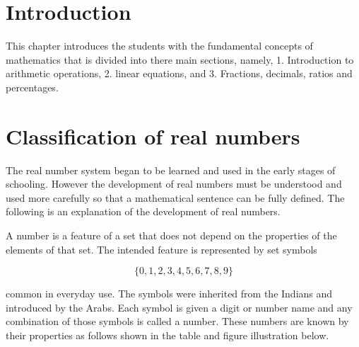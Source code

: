 \documentclass[
]{book}
\begin{document}
\hypertarget{introduction}{%
\section{Introduction}\label{introduction}}

This chapter introduces the students with the fundamental concepts of mathematics that is divided into there main sections, namely, 1. Introduction to arithmetic operations, 2. linear equations, and 3. Fractions, decimals, ratios and percentages.

\hypertarget{classification-of-real-numbers}{%
\section{Classification of real numbers}\label{classification-of-real-numbers}}

The real number system began to be learned and used in the early stages of schooling. However the development of real numbers must be understood and used more carefully so that a mathematical sentence can be fully defined. The following is an explanation of the development of real numbers.

A number is a feature of a set that does not depend on the properties of the elements of that set. The intended feature is represented by set symbols

\[\{ 0, 1, 2, 3, 4, 5, 6, 7, 8, 9 \}\]

common in everyday use. The symbols were inherited from the Indians and introduced by the Arabs. Each symbol is given a digit or number name and any combination of those symbols is called a number. These numbers are known by their properties as follows shown in the table and figure illustration below.
\end{document}
